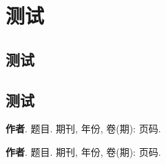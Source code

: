 \documentclass[library = {math.master}, type = for-library]{whuthesis}
\begin{document}
\chapter{测试}
\zhlipsum[1-4]
\section{测试}
\zhlipsum[1-4]
\section{测试}
\zhlipsum[1-4]
\nocite{*}


\printbibliography

\backmatter
\begin{publications}
  \item \textbf{作者}. 题目. 期刊, 年份, 卷(期): 页码.
  \item \textbf{作者}. 题目. 期刊, 年份, 卷(期): 页码.
\end{publications}

\begin{acknowledgement}
  \zhlipsum[1-2]
\end{acknowledgement}

\end{document}
